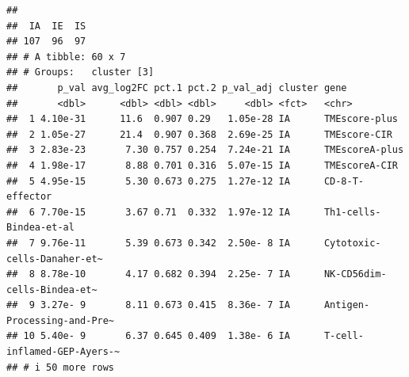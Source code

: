 \documentclass[
  12pt,
]{book}
\newenvironment{Shaded}{\begin{snugshade}}{\end{snugshade}}
\newcommand{\AttributeTok}[1]{\textcolor[rgb]{0.13,0.29,0.53}{#1}}
\newcommand{\DecValTok}[1]{\textcolor[rgb]{0.00,0.00,0.81}{#1}}
\newcommand{\FunctionTok}[1]{\textcolor[rgb]{0.13,0.29,0.53}{\textbf{#1}}}
\newcommand{\NormalTok}[1]{#1}
\newcommand{\OtherTok}[1]{\textcolor[rgb]{0.56,0.35,0.01}{#1}}
\newcommand{\SpecialCharTok}[1]{\textcolor[rgb]{0.81,0.36,0.00}{\textbf{#1}}}
\newcommand{\StringTok}[1]{\textcolor[rgb]{0.31,0.60,0.02}{#1}}
\begin{document}
\begin{verbatim}
## 
##  IA  IE  IS 
## 107  96  97 
## # A tibble: 60 x 7
## # Groups:   cluster [3]
##       p_val avg_log2FC pct.1 pct.2 p_val_adj cluster gene                       
##       <dbl>      <dbl> <dbl> <dbl>     <dbl> <fct>   <chr>                      
##  1 4.10e-31      11.6  0.907 0.29   1.05e-28 IA      TMEscore-plus              
##  2 1.05e-27      21.4  0.907 0.368  2.69e-25 IA      TMEscore-CIR               
##  3 2.83e-23       7.30 0.757 0.254  7.24e-21 IA      TMEscoreA-plus             
##  4 1.98e-17       8.88 0.701 0.316  5.07e-15 IA      TMEscoreA-CIR              
##  5 4.95e-15       5.30 0.673 0.275  1.27e-12 IA      CD-8-T-effector            
##  6 7.70e-15       3.67 0.71  0.332  1.97e-12 IA      Th1-cells-Bindea-et-al     
##  7 9.76e-11       5.39 0.673 0.342  2.50e- 8 IA      Cytotoxic-cells-Danaher-et~
##  8 8.78e-10       4.17 0.682 0.394  2.25e- 7 IA      NK-CD56dim-cells-Bindea-et~
##  9 3.27e- 9       8.11 0.673 0.415  8.36e- 7 IA      Antigen-Processing-and-Pre~
## 10 5.40e- 9       6.37 0.645 0.409  1.38e- 6 IA      T-cell-inflamed-GEP-Ayers-~
## # i 50 more rows
\end{verbatim}

\begin{Shaded}
\end{Shaded}
\end{document}
